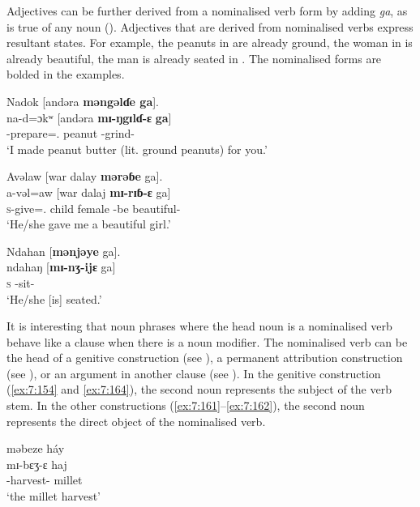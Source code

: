 Adjectives can be further derived from a nominalised verb form by adding \textit{ga}, as is true of any noun (). Adjectives that are derived from nominalised verbs express resultant states. For example, the peanuts in  are already ground, the woman in  is already beautiful, the man is already seated in . The nominalised forms are bolded in the examples. 

\ea\label{ex:7:158}
Nadok  [andəra  \textbf{məngəlɗe  ga}].\\
\gll  na-d=ɔkʷ    [andəra \textbf{mɪ-ŋgɪlɗ-ɛ}    \textbf{ga}]\\
      {\oneS}-prepare={\twoS}.{\IO}  peanut     {\NOM}{}-grind-{\CL}    {\ADJ}\\
\glt  ‘I made peanut butter (lit. ground peanuts) for you.’\\
\z 

\ea\label{ex:7:159}
Avəlaw  [war  dalay  \textbf{mərəɓe}  ga].\\
\gll  a-vəl=aw    [war   dalaj  \textbf{mɪ-rɪɓ-ɛ}      ga]\\
      \textsc{s}-give={\oneS}.{\IO}  child  female  {\NOM}{}-{be beautiful}-{\CL}  {\ADJ}\\
\glt  ‘He/she gave me a beautiful girl.’ \\
\z 

\ea\label{ex:7:160}
Ndahan  [\textbf{mənjəye}  ga].\\
\gll  ndahaŋ  [\textbf{mɪ-nʒ-ijɛ}  ga]\\
      \textsc{s}    {\NOM}{}-sit-{\CL}  {\ADJ}\\
\glt  ‘He/she [is] seated.’\\
\z 

It is interesting that noun phrases where the head noun is a nominalised verb behave like a clause when there is a noun modifier. The nominalised verb can be the head of a genitive construction (see ), a permanent attribution construction (see ), or an argument in another clause (see ). In the genitive construction (\ref{ex:7:154} and \ref{ex:7:164}), the second noun represents the subject of the verb stem. In the other constructions (\ref{ex:7:161}--\ref{ex:7:162}), the second noun represents the direct object of the nominalised verb. 

\ea\label{ex:7:161}
məbeze  háy\\
\gll  mɪ-bɛʒ-ɛ     haj\\
      {\NOM}{}-harvest-{\CL}  millet\\
\glt  ‘the millet harvest’\\
\z 

